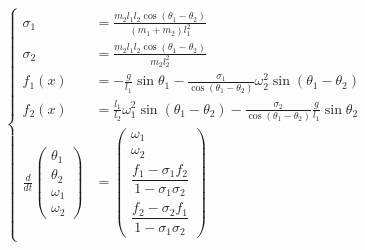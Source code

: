 \documentclass[11pt,a4paper]{article}
\begin{document}
\[
\left\{
\begin{aligned}
\sigma_1 &= \frac{m_2 l_1 l_2 \cos(\theta_1 - \theta_2)}{(m_1 + m_2) l_1^2} \\
\sigma_2 &= \frac{m_2 l_1 l_2 \cos(\theta_1 - \theta_2)}{m_2 l_2^2} \\
f_1(x) &= -\frac{g}{l_1} \sin\theta_1 - \frac{\sigma_1}{\cos(\theta_1 - \theta_2)} \omega_2^2 \sin(\theta_1 - \theta_2) \\
f_2(x) &= \frac{l_1}{l_2} \omega_1^2 \sin(\theta_1 - \theta_2) - \frac{\sigma_2}{\cos(\theta_1 - \theta_2)} \frac{g}{l_1} \sin\theta_2 \\
\frac{d}{dt} \begin{pmatrix} \theta_1 \\ \theta_2 \\ \omega_1 \\ \omega_2 \end{pmatrix} &= \begin{pmatrix} \omega_1 \\ \omega_2 \\ \dfrac{f_1 - \sigma_1 f_2}{1 - \sigma_1 \sigma_2} \\ \dfrac{f_2 - \sigma_2 f_1}{1 - \sigma_1 \sigma_2} \end{pmatrix}
\end{aligned}
\right.
\]
\end{document}
